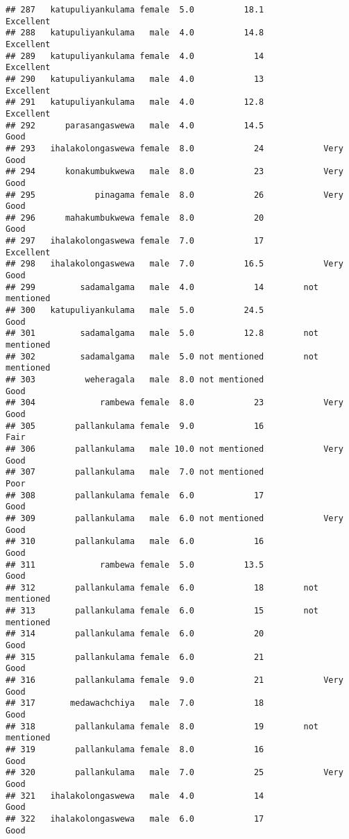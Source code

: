 \documentclass[
]{article}
\begin{document}
\begin{verbatim}
## 287   katupuliyankulama female  5.0          18.1            Excellent
## 288   katupuliyankulama   male  4.0          14.8            Excellent
## 289   katupuliyankulama female  4.0            14            Excellent
## 290   katupuliyankulama   male  4.0            13            Excellent
## 291   katupuliyankulama   male  4.0          12.8            Excellent
## 292      parasangaswewa   male  4.0          14.5                 Good
## 293   ihalakolongaswewa female  8.0            24            Very Good
## 294      konakumbukwewa   male  8.0            23            Very Good
## 295            pinagama female  8.0            26            Very Good
## 296      mahakumbukwewa female  8.0            20                 Good
## 297   ihalakolongaswewa female  7.0            17            Excellent
## 298   ihalakolongaswewa   male  7.0          16.5            Very Good
## 299         sadamalgama   male  4.0            14        not mentioned
## 300   katupuliyankulama   male  5.0          24.5                 Good
## 301         sadamalgama   male  5.0          12.8        not mentioned
## 302         sadamalgama   male  5.0 not mentioned        not mentioned
## 303          weheragala   male  8.0 not mentioned                 Good
## 304             rambewa female  8.0            23            Very Good
## 305        pallankulama female  9.0            16                 Fair
## 306        pallankulama   male 10.0 not mentioned            Very Good
## 307        pallankulama   male  7.0 not mentioned                 Poor
## 308        pallankulama female  6.0            17                 Good
## 309        pallankulama   male  6.0 not mentioned            Very Good
## 310        pallankulama   male  6.0            16                 Good
## 311             rambewa female  5.0          13.5                 Good
## 312        pallankulama female  6.0            18        not mentioned
## 313        pallankulama female  6.0            15        not mentioned
## 314        pallankulama female  6.0            20                 Good
## 315        pallankulama female  6.0            21                 Good
## 316        pallankulama female  9.0            21            Very Good
## 317       medawachchiya   male  7.0            18                 Good
## 318        pallankulama female  8.0            19        not mentioned
## 319        pallankulama female  8.0            16                 Good
## 320        pallankulama   male  7.0            25            Very Good
## 321   ihalakolongaswewa   male  4.0            14                 Good
## 322   ihalakolongaswewa   male  6.0            17                 Good

\end{verbatim}
\end{document}
